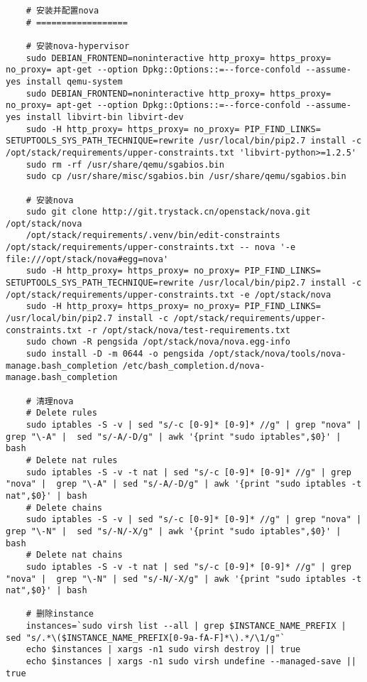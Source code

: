 \documentclass[a4paper,left=1.5cm,right=1.5cm,11pt]{article}
\begin{document}
\begin{lstlisting}
	# 安装并配置nova
	# ==================

	# 安装nova-hypervisor
	sudo DEBIAN_FRONTEND=noninteractive http_proxy= https_proxy= no_proxy= apt-get --option Dpkg::Options::=--force-confold --assume-yes install qemu-system
	sudo DEBIAN_FRONTEND=noninteractive http_proxy= https_proxy= no_proxy= apt-get --option Dpkg::Options::=--force-confold --assume-yes install libvirt-bin libvirt-dev
	sudo -H http_proxy= https_proxy= no_proxy= PIP_FIND_LINKS= SETUPTOOLS_SYS_PATH_TECHNIQUE=rewrite /usr/local/bin/pip2.7 install -c /opt/stack/requirements/upper-constraints.txt 'libvirt-python>=1.2.5'
	sudo rm -rf /usr/share/qemu/sgabios.bin
	sudo cp /usr/share/misc/sgabios.bin /usr/share/qemu/sgabios.bin

	# 安装nova
	sudo git clone http://git.trystack.cn/openstack/nova.git /opt/stack/nova
	/opt/stack/requirements/.venv/bin/edit-constraints /opt/stack/requirements/upper-constraints.txt -- nova '-e file:///opt/stack/nova#egg=nova'
	sudo -H http_proxy= https_proxy= no_proxy= PIP_FIND_LINKS= SETUPTOOLS_SYS_PATH_TECHNIQUE=rewrite /usr/local/bin/pip2.7 install -c /opt/stack/requirements/upper-constraints.txt -e /opt/stack/nova
	sudo -H http_proxy= https_proxy= no_proxy= PIP_FIND_LINKS= /usr/local/bin/pip2.7 install -c /opt/stack/requirements/upper-constraints.txt -r /opt/stack/nova/test-requirements.txt
	sudo chown -R pengsida /opt/stack/nova/nova.egg-info
	sudo install -D -m 0644 -o pengsida /opt/stack/nova/tools/nova-manage.bash_completion /etc/bash_completion.d/nova-manage.bash_completion
	
	# 清理nova
	# Delete rules
    sudo iptables -S -v | sed "s/-c [0-9]* [0-9]* //g" | grep "nova" | grep "\-A" |  sed "s/-A/-D/g" | awk '{print "sudo iptables",$0}' | bash
    # Delete nat rules
    sudo iptables -S -v -t nat | sed "s/-c [0-9]* [0-9]* //g" | grep "nova" |  grep "\-A" | sed "s/-A/-D/g" | awk '{print "sudo iptables -t nat",$0}' | bash
    # Delete chains
    sudo iptables -S -v | sed "s/-c [0-9]* [0-9]* //g" | grep "nova" | grep "\-N" |  sed "s/-N/-X/g" | awk '{print "sudo iptables",$0}' | bash
    # Delete nat chains
    sudo iptables -S -v -t nat | sed "s/-c [0-9]* [0-9]* //g" | grep "nova" |  grep "\-N" | sed "s/-N/-X/g" | awk '{print "sudo iptables -t nat",$0}' | bash
	
	# 删除instance
	instances=`sudo virsh list --all | grep $INSTANCE_NAME_PREFIX | sed "s/.*\($INSTANCE_NAME_PREFIX[0-9a-fA-F]*\).*/\1/g"`
	echo $instances | xargs -n1 sudo virsh destroy || true
	echo $instances | xargs -n1 sudo virsh undefine --managed-save || true


\end{lstlisting}
\end{document}
